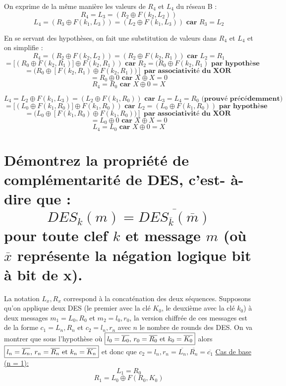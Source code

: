\documentclass[fleqn]{article}
\begin{document}
On exprime de la même manière les valeurs de $R_4$ et $L_4$ du réseau B :
\[R_4 = L_3 = \boxed{(R_2 \oplus F(k_2, L_2))}\]
\[L_4 = (R_3 \oplus F(k_1, L_3)) = \boxed{(L_2 \oplus F(k_1, L_3))} \textbf{ car } R_3 = L_2\]\newline

En se servant des hypothèses, on fait une substitution de valeurs dans $R_4$ et $L_4$ et on simplifie :
\[R_4 = (R_2 \oplus F(k_2, L_2)) = (R_2 \oplus F(k_2, R_1)) \textbf{ car } L_2 = R_1\]
\[= [(R_0 \oplus F(k_2, R_1)] \oplus F(k_2, R_1)) \textbf{ car } R_2 = (R_0 \oplus F(k_2, R_1) \textbf{ par hypothèse}\]
\[= (R_0 \oplus [F(k_2, R_1) \oplus F(k_2, R_1))] \textbf{ par associativité du XOR }\]
\[= R_0 \oplus 0 \textbf{ car } X \oplus X = 0\]
\[\boxed{R_4 = R_0} \textbf{ car } X \oplus 0 = X\]

\[L_4 = L_2 \oplus F(k_1, L_3) = (L_2 \oplus F(k_1, R_0)) \textbf{ car } L_3 = L_4 = R_0 \textbf{ (prouvé précédemment)}\]
\[= [(L_0 \oplus F(k_1, R_0)] \oplus F(k_1, R_0)) \textbf{ car } L_2 = (L_0 \oplus F(k_1, R_0)) \textbf{ par hypothèse}\]
\[= (L_0 \oplus [F(k_1, R_0) \oplus F(k_1, R_0))] \textbf{ par associativité du XOR }\]
\[= L_0 \oplus 0 \textbf{ car } X \oplus X = 0\]
\[\boxed{L_4 = L_0} \textbf{ car } X \oplus 0 = X\]

\section{\normalsize  D\'{e}montrez la propri\'{e}t\'{e} de compl\'{e}mentarit\'{e} de DES, c'est- \`{a}-dire que :
$$
DES_{k}(m)=\overline{DES_{\overline{k}}(\overline{m})}
$$
pour toute clef $k$ et message $m$ (o\`{u} $\overline{x}$ repr\'{e}sente la n\'{e}gation logique bit \`{a} bit de x).}

La notation $L_x, R_x$ correspond à la concaténation des deux séquences.\newline\newline
Supposons qu'on applique deux DES (le premier avec la clé $K_0$, le deuxième avec la clé $k_0$) à deux messages $m_1 =  L_0, R_0$ et $m_2 =  l_0, r_0$, la version chiffrée de ces messages est de la forme $c_1 =  L_n, R_n$ et $c_2 =  l_n, r_n$ avec $n$ le nombre de rounds des DES.\newline\newline
On va montrer que sous l'hypothèse où $\boxed{l_0 = \overline{L_0}$, $r_0 = \overline{R_0}$ et $k_0 = \overline{K_0}}$ alors $\boxed{l_n = \overline{L_n}$, $r_n = \overline{R_n}$ et $k_n = \overline{K_n}}$ et donc que $c_2 = l_n, r_n = \overline{L_n}, \overline{R_n} = \overline{c_1}$
\newline\newline
\underline{Cas de base (n = 1):}\newline
\[L_1 = R_0\]
\[R_1 = L_0 \oplus F(R_0, K_0)\]
\end{document}
